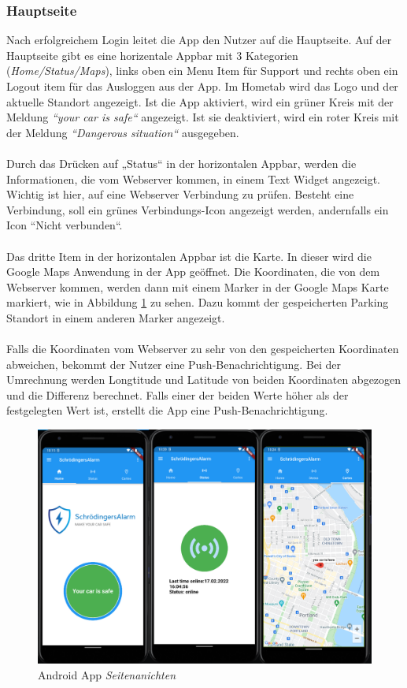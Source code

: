 \subsubsection{Hauptseite}
Nach erfolgreichem Login leitet die App den Nutzer auf die Hauptseite.
Auf der Hauptseite gibt es eine horizentale Appbar mit 3 Kategorien (\textit{Home/Status/Maps}), links oben ein Menu Item für Support und rechts oben ein Logout item für das Ausloggen aus der App.
Im Hometab wird das Logo und der aktuelle Standort angezeigt.
Ist die App aktiviert, wird ein grüner Kreis mit der Meldung \textit{“your car is safe“} angezeigt.
Ist sie deaktiviert, wird ein roter Kreis mit der Meldung \textit{“Dangerous situation“} ausgegeben.\\\\
Durch das Drücken auf „Status“ in der horizontalen Appbar, werden die Informationen, die vom Webserver kommen, in einem Text Widget angezeigt.
Wichtig ist hier, auf eine Webserver Verbindung zu prüfen. Besteht eine Verbindung, soll ein grünes Verbindungs-Icon angezeigt werden, andernfalls ein  Icon “Nicht verbunden“.\\\\
Das dritte Item in der horizontalen Appbar ist die Karte. In dieser wird die Google Maps Anwendung in der App geöffnet.
Die Koordinaten, die von dem Webserver kommen, werden dann mit einem Marker in der Google Maps Karte markiert, wie in Abbildung \ref{seiten} zu sehen. 
Dazu kommt der gespeicherten Parking Standort in einem anderen Marker angezeigt.\\\\
Falls die Koordinaten vom Webserver zu sehr von den gespeicherten Koordinaten abweichen, bekommt der Nutzer eine Push-Benachrichtigung. Bei der Umrechnung werden Longtitude und Latitude von beiden Koordinaten abgezogen und die Differenz berechnet.
Falls einer der beiden Werte höher als der festgelegten Wert ist, erstellt die App eine Push-Benachrichtigung.
 	\begin{figure}[H]
   \centering
            \includegraphics[width=1\textwidth]{Bilder/hauptseite.PNG}
		            \caption{Android App \textit{Seitenanichten}}
		            \label{seiten}
    \end{figure}
